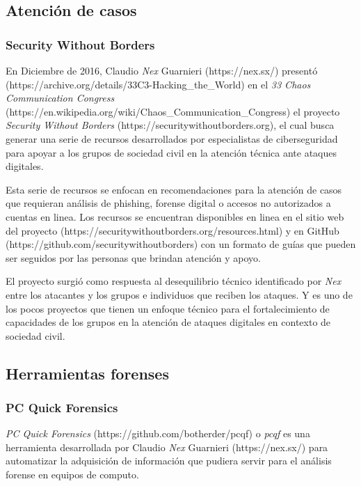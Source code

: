 \documentclass[12pt]{caltech_thesis}
\begin{document}
\subsection{Atención de casos}

\subsubsection{Security Without Borders}

En Diciembre de 2016, Claudio \textit{Nex} Guarnieri (https://nex.sx/) presentó (https://archive.org/details/33C3-Hacking\_the\_World) en el \textit{33 Chaos Communication Congress} (https://en.wikipedia.org/wiki/Chaos\_Communication\_Congress) el proyecto \textit{Security Without Borders} (https://securitywithoutborders.org), el cual busca generar una serie de recursos desarrollados por especialistas de ciberseguridad para apoyar a los grupos de sociedad civil en la atención técnica ante ataques digitales.

Esta serie de recursos se enfocan en recomendaciones para la atención de casos que requieran análisis de phishing, forense digital o accesos no autorizados a cuentas en linea. Los recursos se encuentran disponibles en linea en el sitio web del proyecto (https://securitywithoutborders.org/resources.html) y en GitHub (https://github.com/securitywithoutborders) con un formato de guías que pueden ser seguidos por las personas que brindan atención y apoyo.

El proyecto surgió como respuesta al desequilibrio técnico identificado por \textit{Nex} entre los atacantes y los grupos e individuos que reciben los ataques. Y es uno de los pocos proyectos que tienen un enfoque técnico para el fortalecimiento de capacidades de los grupos en la atención de ataques digitales en contexto de sociedad civil.

\subsection{Herramientas forenses}

\subsubsection{PC Quick Forensics}

\textit{PC Quick Forensics} (https://github.com/botherder/pcqf) o \textit{pcqf} es una herramienta desarrollada por Claudio \textit{Nex} Guarnieri (https://nex.sx/) para automatizar la adquisición de información que pudiera servir para el análisis forense en equipos de computo.
\end{document}
